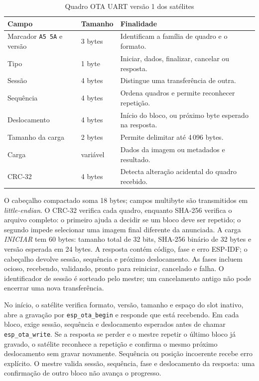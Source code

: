\begin{table}[htbp]\centering\small
\caption{Quadro OTA UART versão 1 dos satélites}\label{tab:quadro-ota-satelite}
\begin{tabularx}{\textwidth}{@{}l l X@{}}\toprule
Campo & Tamanho & Finalidade\\\midrule
Marcador \texttt{A5 5A} e versão & 3 bytes & Identificam a família de quadro e o formato.\\
Tipo & 1 byte & Iniciar, dados, finalizar, cancelar ou resposta.\\
Sessão & 4 bytes & Distingue uma transferência de outra.\\
Sequência & 4 bytes & Ordena quadros e permite reconhecer repetição.\\
Deslocamento & 4 bytes & Início do bloco, ou próximo byte esperado na resposta.\\
Tamanho da carga & 2 bytes & Permite delimitar até 4\,096 bytes.\\
Carga & variável & Dados da imagem ou metadados e resultado.\\
CRC-32 & 4 bytes & Detecta alteração acidental do quadro recebido.\\\bottomrule
\end{tabularx}\end{table}

O cabeçalho compactado soma 18 bytes; campos multibyte são transmitidos em \emph{little-endian}. O CRC-32 verifica cada quadro, enquanto SHA-256 verifica o arquivo completo: o primeiro ajuda a decidir se um bloco deve ser repetido; o segundo impede selecionar uma imagem final diferente da anunciada. A carga \emph{INICIAR} tem 60 bytes: tamanho total de 32 bits, SHA-256 binário de 32 bytes e versão esperada em 24 bytes. A resposta contém código, fase e erro ESP-IDF; o cabeçalho devolve sessão, sequência e próximo deslocamento. As fases incluem ocioso, recebendo, validando, pronto para reiniciar, cancelado e falha. O identificador de sessão é sorteado pelo mestre; um cancelamento antigo não pode encerrar uma nova transferência.

No início, o satélite verifica formato, versão, tamanho e espaço do slot inativo, abre a gravação por \texttt{esp\_ota\_begin} e responde que está recebendo. Em cada bloco, exige sessão, sequência e deslocamento esperados antes de chamar \texttt{esp\_ota\_write}. Se a resposta se perder e o mestre repetir o último bloco já gravado, o satélite reconhece a repetição e confirma o mesmo próximo deslocamento sem gravar novamente. Sequência ou posição incoerente recebe erro explícito. O mestre valida sessão, sequência, fase e deslocamento da resposta: uma confirmação de outro bloco não avança o progresso.


